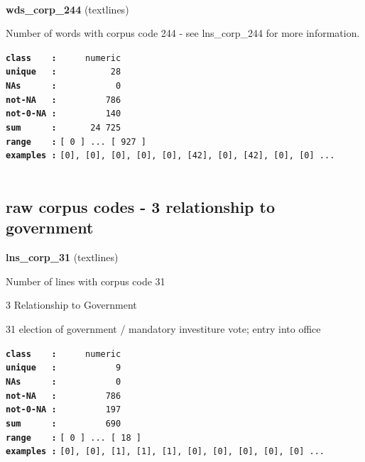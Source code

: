 \documentclass[]{article}
\begin{document}
~

\textbf{wds\_corp\_244} (textlines)

Number of words with corpus code 244 - see lns\_corp\_244 for more
information.

\textbf{\texttt{class\ \ \ \ :}} \texttt{~~~~~numeric}\\
\textbf{\texttt{unique\ \ \ :}} \texttt{~~~~~~~~~~28}\\
\textbf{\texttt{NAs\ \ \ \ \ \ :}} \texttt{~~~~~~~~~~~0}\\
\textbf{\texttt{not-NA\ \ \ :}} \texttt{~~~~~~~~~786}\\
\textbf{\texttt{not-0-NA\ :}} \texttt{~~~~~~~~~140}\\
\textbf{\texttt{sum\ \ \ \ \ \ :}} \texttt{~~~~~~24~725}\\
\textbf{\texttt{range\ \ \ \ :}}
\texttt{{[}\ 0\ {]}\ ...\ {[}\ 927\ {]}}\\
\textbf{\texttt{examples\ :}}
\texttt{{[}0{]},\ {[}0{]},\ {[}0{]},\ {[}0{]},\ {[}0{]},\ {[}42{]},\ {[}0{]},\ {[}42{]},\ {[}0{]},\ {[}0{]}\ ...}\\

~

\subsection{raw corpus codes - 3 relationship to
government}\label{raw-corpus-codes---3-relationship-to-government}

\textbf{lns\_corp\_31} (textlines)

Number of lines with corpus code 31

3 Relationship to Government

31 election of government / mandatory investiture vote; entry into
office

\textbf{\texttt{class\ \ \ \ :}} \texttt{~~~~~numeric}\\
\textbf{\texttt{unique\ \ \ :}} \texttt{~~~~~~~~~~~9}\\
\textbf{\texttt{NAs\ \ \ \ \ \ :}} \texttt{~~~~~~~~~~~0}\\
\textbf{\texttt{not-NA\ \ \ :}} \texttt{~~~~~~~~~786}\\
\textbf{\texttt{not-0-NA\ :}} \texttt{~~~~~~~~~197}\\
\textbf{\texttt{sum\ \ \ \ \ \ :}} \texttt{~~~~~~~~~690}\\
\textbf{\texttt{range\ \ \ \ :}}
\texttt{{[}\ 0\ {]}\ ...\ {[}\ 18\ {]}}\\
\textbf{\texttt{examples\ :}}
\texttt{{[}0{]},\ {[}0{]},\ {[}1{]},\ {[}1{]},\ {[}1{]},\ {[}0{]},\ {[}0{]},\ {[}0{]},\ {[}0{]},\ {[}0{]}\ ...}\\
\end{document}
